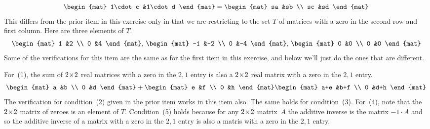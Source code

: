 \begin{exercises}
\begin{answer}
\begin{exparts}
\begin{equation*}
\begin{mat}
              1\cdot c  &1\cdot d
            \end{mat}
            =
            \begin{mat}
              sa  &sb  \\
              sc  &sd
            \end{mat}
          \end{equation*}
        \partsitem 
          This differs from the prior item in this exercise only in that
          we are restricting to the set $T$ of matrices with a zero in the
          second row and first column. 
          Here are three elements of $T$.
          \begin{equation*}
            \begin{mat}
              1  &2  \\
              0  &4
            \end{mat},\,
            \begin{mat}
              -1  &-2  \\
              0  &-4
            \end{mat},\,
            \begin{mat}
              0  &0  \\
              0  &0
            \end{mat}
          \end{equation*}
          Some of the verifications for this item are the same as for the 
          first item in this exercise, and below we'll just do the ones that
          are different. 

          For~(1), the sum of $2 \! \times \! 2$ real matrices with a zero in the
          $2,1$ entry is also a $2 \! \times \! 2$ real matrix with a zero in the
          $2,1$ entry.
          \begin{equation*}
            \begin{mat}
              a  &b  \\
              0  &d
            \end{mat}
            +
            \begin{mat}
              e  &f  \\
              0  &h
            \end{mat}
            \begin{mat}
              a+e  &b+f  \\
              0    &d+h
            \end{mat}
          \end{equation*}
          The verification for condition~(2) given in the prior item
          works in this item also.
          The same holds for condition~(3).
          For~(4), note that the $2 \! \times \! 2$ 
          matrix of zeroes is an element of $T$.
          Condition~(5) holds because for any $2 \! \times \! 2$ matrix~$A$
          the additive inverse is the matrix 
          $-1\cdot A$ and so the additive inverse of a 
          matrix with a zero in the $2,1$ entry is also a matris with a zero
          in the $2,1$ entry.


\end{exparts}
\end{answer}
\end{exercises}
